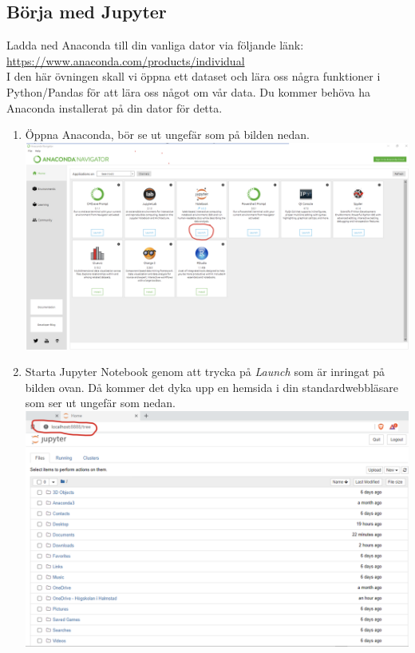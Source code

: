 \documentclass{article}
\begin{document}
\subsection{Börja med Jupyter}
Ladda ned Anaconda till din vanliga dator via följande länk:\\
\url{https://www.anaconda.com/products/individual}\\
I den här övningen skall vi öppna ett dataset och lära oss några funktioner i Python/Pandas för att lära oss något om vår data. Du kommer behöva ha Anaconda installerat på din dator för detta.  
\begin{enumerate}
\item Öppna Anaconda, bör se ut ungefär som på bilden nedan.\\
  \includegraphics[width=\textwidth]{figures/anaconda1.png}
\item Starta Jupyter Notebook genom att trycka på \emph{Launch} som är inringat på bilden ovan. Då kommer det dyka upp en hemsida i din standardwebbläsare som ser ut ungefär som nedan.\\
  \includegraphics[width=\textwidth]{figures/anaconda2.png}\\

\end{enumerate}
\end{document}
